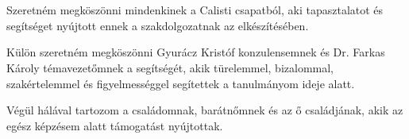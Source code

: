 \chapter*{\koszonetnyilvanitas}

Szeretném megköszönni mindenkinek a Calisti csapatból, aki tapasztalatot és segítséget nyújtott ennek a szakdolgozatnak az elkészítésében.

Külön szeretném megköszönni Gyurácz Kristóf konzulensemnek és Dr. Farkas Károly témavezetőmnek a segítségét, akik türelemmel, bizalommal, szakértelemmel és figyelmességgel segítettek a tanulmányom ideje alatt.

Végül hálával tartozom a családomnak, barátnőmnek és az ő családjának, akik az egész képzésem alatt támogatást nyújtottak.